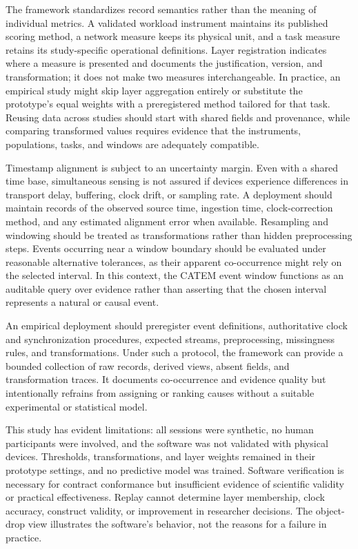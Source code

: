 \documentclass[letterpaper,10pt,conference]{ieeeconf}
\begin{document}
The framework standardizes record semantics rather than the meaning of individual metrics. A validated workload instrument maintains its published scoring method, a network measure keeps its physical unit, and a task measure retains its study-specific operational definitions. Layer registration indicates where a measure is presented and documents the justification, version, and transformation; it does not make two measures interchangeable. In practice, an empirical study might skip layer aggregation entirely or substitute the prototype's equal weights with a preregistered method tailored for that task. Reusing data across studies should start with shared fields and provenance, while comparing transformed values requires evidence that the instruments, populations, tasks, and windows are adequately compatible.

Timestamp alignment is subject to an uncertainty margin. Even with a shared time base, simultaneous sensing is not assured if devices experience differences in transport delay, buffering, clock drift, or sampling rate. A deployment should maintain records of the observed source time, ingestion time, clock-correction method, and any estimated alignment error when available. Resampling and windowing should be treated as transformations rather than hidden preprocessing steps. Events occurring near a window boundary should be evaluated under reasonable alternative tolerances, as their apparent co-occurrence might rely on the selected interval. In this context, the CATEM event window functions as an auditable query over evidence rather than asserting that the chosen interval represents a natural or causal event.

An empirical deployment should preregister event definitions, authoritative clock and synchronization procedures, expected streams, preprocessing, missingness rules, and transformations. Under such a protocol, the framework can provide a bounded collection of raw records, derived views, absent fields, and transformation traces. It documents co-occurrence and evidence quality but intentionally refrains from assigning or ranking causes without a suitable experimental or statistical model.

This study has evident limitations: all sessions were synthetic, no human participants were involved, and the software was not validated with physical devices. Thresholds, transformations, and layer weights remained in their prototype settings, and no predictive model was trained. Software verification is necessary for contract conformance but insufficient evidence of scientific validity or practical effectiveness. Replay cannot determine layer membership, clock accuracy, construct validity, or improvement in researcher decisions. The object-drop view illustrates the software's behavior, not the reasons for a failure in practice.
\end{document}
